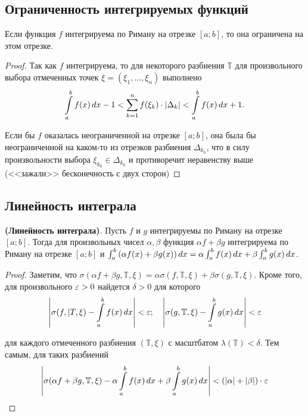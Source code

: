 \documentclass[a4paper]{article}
\theoremstyle{named}
\newcommand{\T}{\mathbb{T}}
\renewcommand{\int}{\intop}
\begin{document}
        \subsection{Ограниченность интегрируемых функций}

        \begin{proposal*}
            Если функция $f$ интегрируема по Риману на отрезке $[a; b]$, то она ограничена на этом отрезке.
        \end{proposal*}

        \begin{proof}
            Так как $f$ интегрируема, то для некоторого разбиения $\T$ для произвольного выбора отмеченных точек $\xi = (\xi_1, \dots, \xi_n)$ выполнено
            \begin{equation*}
                \int_a^b f(x) \dd x - 1 < \sum_{k = 1}^n f(\xi_k) \cdot |\Delta_k| < \int_a^b f(x) \dd x + 1.
            \end{equation*}

            Если бы $f$ оказалась неограниченной на отрезке $[a; b]$, она была бы неограниченной на каком-то из отрезков разбиения $\Delta_{k_0}$, что в силу произвольности выбора $\xi_{k_0} \in \Delta_{k_0}$ и противоречит неравенству выше (<<зажали>> бесконечность с двух сторон)
        \end{proof}

        \subsection{Линейность интеграла}

        \begin{proposal*}
            \textbf{(Линейность интеграла)}. Пусть $f$ и $g$ интегрируемы по Риману на отрезке $[a; b]$. Тогда для произвольных чисел $\alpha, \beta$ функция $\alpha f + \beta g$ интегрируема по Риману на отрезке $[a; b]$ и $\int_a^b \left(\alpha f(x) + \beta g(x)\right) \dd x = \alpha \int_a^b f(x) \dd x + \beta \int_a^b g(x) \dd x$.
        \end{proposal*}

        \begin{proof}
            Заметим, что $\sigma(\alpha f + \beta g, \T, \xi) = \alpha \sigma(f, \T, \xi) + \beta \sigma(g, \T, \xi)$. Кроме того, для произвольного $\varepsilon > 0$ найдется $\delta > 0$ для которого
            \begin{equation*}
                \left|\sigma(f, |T, \xi) - \int_a^b f(x) \dd x\right| < \eps; \quad
                \left|\sigma(g, \T, \xi) - \int_a^b g(x) \dd x\right| < \eps
            \end{equation*}

            для каждого отмеченного разбиения $(\T, \xi)$ с масштбатом $\lambda(\T) < \delta$. Тем самым, для таких разбиений
            \begin{equation*}
                \left|\sigma(\alpha f + \beta g, \T, \xi) - \alpha \int_a^b f(x) \dd x + \beta \int_a^b g(x) \dd x\right| < (|\alpha| + |\beta|) \cdot \eps
            \end{equation*}
        \end{proof}
\end{document}
